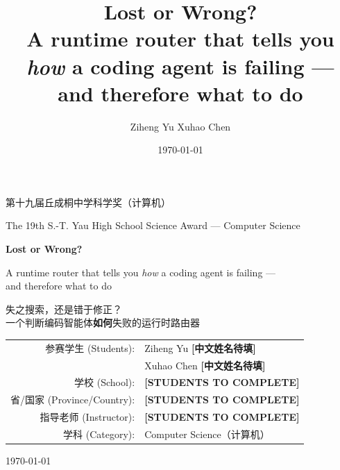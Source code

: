 \documentclass[10pt]{article}
\title{\vspace{-3.2em}Lost or Wrong?\\[3pt]
\large A runtime router that tells you \emph{how} a coding agent is failing --- and therefore what to do}
\author{Ziheng Yu \quad Xuhao Chen}
\date{\today}
\begin{document}
\begin{titlepage}
\centering
\vspace*{2.2cm}
{\large 第十九届丘成桐中学科学奖（计算机）\par}
\vspace{0.4cm}
{\normalsize The 19th S.-T. Yau High School Science Award --- Computer Science\par}
\vspace{2.6cm}
{\LARGE\bfseries Lost or Wrong?\par}
\vspace{0.5cm}
{\large A runtime router that tells you \emph{how} a coding agent is failing ---\\[2pt]
and therefore what to do\par}
\vspace{1.2cm}
{\large 失之搜索，还是错于修正？\\
一个判断编码智能体\textbf{如何}失败的运行时路由器\par}
\vspace{2.4cm}
{\large
\begin{tabular}{rl}
参赛学生 (Students): & Ziheng Yu \textbf{[中文姓名待填]} \\[4pt]
                     & Xuhao Chen \textbf{[中文姓名待填]} \\[10pt]
学校 (School):        & \textbf{[STUDENTS TO COMPLETE]}\\[4pt]
省/国家 (Province/Country): & \textbf{[STUDENTS TO COMPLETE]}\\[4pt]
指导老师 (Instructor): & \textbf{[STUDENTS TO COMPLETE]}\\[4pt]
学科 (Category):       & Computer Science（计算机）\\
\end{tabular}\par}
\vfill
{\large \today\par}
\vspace{1.3cm}
\end{titlepage}

\vspace{0.4em}
\end{document}
